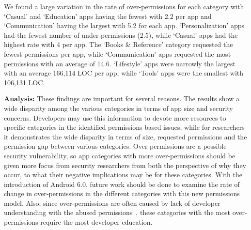 \documentclass{sig-alternate-05-2015}
\begin{document}
\begin{table*}[]
\begin{center}
\begin{tabular}{ | l | c | c | c | c | c |  c |}
	
	
  \end{tabular}
  \end{center}
\end{table*}




We found a large variation in the rate of over-permissions for each category with `Casual' and `Education' apps having the fewest with 2.2 per app and `Communication' having the largest with 5.2 for each app. `Personalization' apps had the fewest number of under-permissions (2.5), while `Casual' apps had the highest rate with 4 per app. The `Books \& Reference' category requested the fewest permissions per app, while `Communication' apps requested the most permissions with an average of 14.6. `Lifestyle' apps were narrowly the largest with an average 166,114 LOC per app, while `Tools' apps were the smallest with 106,131 LOC.

\noindent
\textbf{Analysis:} These findings are important for several reasons. The results show a wide disparity among the various categories in terms of app size and security concerns. Developers may use this information to devote more resources to specific categories in the identified permissions based issues, while for researchers it demonstrates the wide disparity in terms of size, requested permissions and the permission gap between various categories. Over-permissions are a possible security vulnerability, so app categories with more over-permissions should be given more focus from security researchers from both the perspective of why they occur, to what their negative implications may be for these categories. With the introduction of Android 6.0, future work should be done to examine the rate of change in over-permissions in the different categories with this new permissions model. Also, since over-permissions are often caused by lack of developer understanding with the abused permissions~\cite{6624000}, these categories with the most over-permissions require the most developer education.
\end{document}
